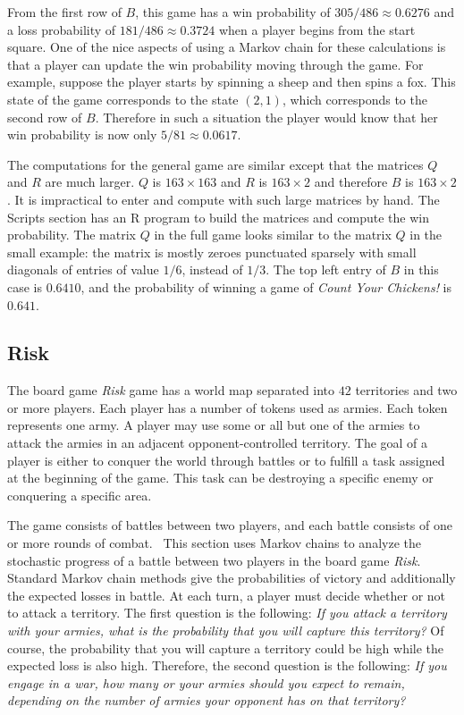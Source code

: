 \documentclass[12pt]{article}
\begin{document}
From the first row of \( B \), this game has a win probability of \(
305/486 \approx 0.6276 \) and a loss probability of \( 181/486 \approx
0.3724 \) when a player begins from the start square.  One of the nice
aspects of using a Markov chain for these calculations is that a player
can update the win probability moving through the game.  For example,
suppose the player starts by spinning a sheep and then spins a fox. This
state of the game corresponds to the state \( (2, 1) \), which
corresponds to the second row of \( B \).  Therefore in such a situation
the player would know that her win probability is now only \( 5/81
\approx 0.0617 \).

The computations for the general game are similar except that the
matrices \( Q \) and \( R \) are much larger.  \( Q \) is \( 163 \times
163 \) and \( R \) is \( 163 \times 2 \) and therefore \( B \) is \( 163
\times 2 \).  It is impractical to enter and compute with such large
matrices by hand.  The Scripts section has an R program to build the
matrices and compute the win probability.  The matrix \( Q \) in the
full game looks similar to the matrix \( Q \) in the small example:  the
matrix is mostly zeroes punctuated sparsely with small diagonals of
entries of value \( 1/6 \), instead of \( 1/3 \).  The top left entry of
\( B \) in this case is \( 0.6410 \), and the probability of winning a
game of \emph{Count Your Chickens!} is \( 0.641 \).

\subsection*{Risk}

The board game \emph{Risk} game has a world map separated into \( 42 \)
territories and two or more players.  Each player has a number of tokens
used as armies.  Each token represents one army.  A player may use some
or all but one of the armies to attack the armies in an adjacent
opponent-controlled territory.  The goal of a player is either to
conquer the world through battles or to fulfill a task assigned at the
beginning of the game.  This task can be destroying a specific enemy or
conquering a specific area.

The game consists of battles between two players, and each battle
consists of one or more rounds of combat.~%
This section uses Markov chains to analyze the stochastic progress of a
battle between two players in the board game \emph{Risk}.  Standard
Markov chain methods give the probabilities of victory and additionally
the expected losses in battle. At each turn, a player must decide
whether or not to attack a territory. The first question is the
following:  \emph{If you attack a territory with your armies, what is
the probability that you will capture this territory?} Of course, the
probability that you will capture a territory could be high while the
expected loss is also high.  Therefore, the second question is the
following:  \emph{If you engage in a war, how many or your armies should
you expect to remain, depending on the number of armies your opponent
has on that territory?}
\end{document}
